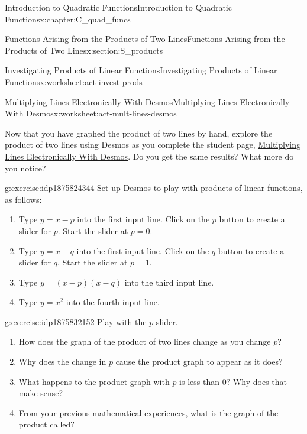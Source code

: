 \documentclass[oneside,10pt,]{book}
\numberwithin{equation}{chapter}
\begin{document}
\begin{chapterptx}{Introduction to Quadratic Functions}{}{Introduction to Quadratic Functions}{}{}{x:chapter:C_quad_funcs}
\begin{sectionptx}{Functions Arising from the Products of Two Lines}{}{Functions Arising from the Products of Two Lines}{}{}{x:section:S_products}
\begin{worksheet-subsection}{Investigating Products of Linear Functions}{}{Investigating Products of Linear Functions}{}{}{x:worksheet:act-invest-prods}
\end{worksheet-subsection}
\restoregeometry
%
%
\typeout{************************************************}
\typeout{************************************************}
%
\begin{worksheet-subsection}{Multiplying Lines Electronically With Desmos}{}{Multiplying Lines Electronically With Desmos}{}{}{x:worksheet:act-mult-lines-desmos}
\begin{introduction}{}%
Now that you have graphed the product of two lines by hand, explore the product of two lines using Desmos as you complete the student page, \hyperref[x:worksheet:act-mult-lines-desmos]{Multiplying Lines Electronically With Desmos}. Do you get the same results? What more do you notice?%
\end{introduction}%
\begin{divisionexercise}{1}{}{}{g:exercise:idp1875824344}%
Set up Desmos to play with products of linear functions, as follows:%
\begin{enumerate}[font=\bfseries,label=(\alph*),ref=\alph*]
\item{}Type \(y = x - p\) into the first input line. Click on the \(p\) button to create a slider for \(p\). Start the slider at \(p = 0\).%
\item{}Type \(y = x - q\) into the first input line. Click on the \(q\) button to create a slider for \(q\). Start the slider at \(p = 1\).%
\item{}Type \(y = (x - p)(x - q)\) into the third input line.%
\item{}Type \(y = x^2\) into the fourth input line.%
\end{enumerate}
\end{divisionexercise}%
\begin{divisionexercise}{2}{}{}{g:exercise:idp1875832152}%
Play with the \(p\) slider.%
\begin{enumerate}[font=\bfseries,label=(\alph*),ref=\alph*]
\item{}How does the graph of the product of two lines change as you change \(p\)?%
\item{}Why does the change in \(p\) cause the product graph to appear as it does?%
\item{}What happens to the product graph with \(p\) is less than 0? Why does that make sense?%
\item{}From your previous mathematical experiences, what is the graph of the product called?%

\end{enumerate}
\end{divisionexercise}
\end{worksheet-subsection}
\end{sectionptx}
\end{chapterptx}
\end{document}
